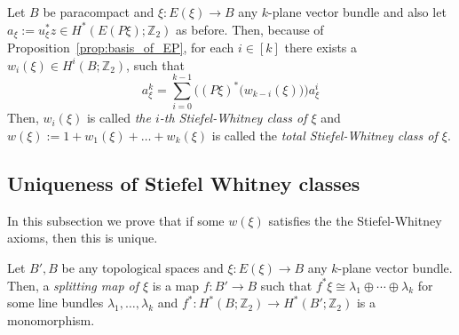 \begin{definition}\label{def:SW} Let $B$ be paracompact and $\xi:E(\xi)\to B$ any $k$-plane vector bundle and also let $a_{\xi}:=u_{\xi}^*z\in H^*(E(P\xi);\mathbb{Z}_2)$ as before. Then, because of Proposition~\ref{prop:basis_of_EP}, for each $i\in[k]$ there exists a $w_i(\xi)\in H^i(B;\mathbb{Z}_2)$, such that
\[a_{\xi}^k=\sum_{i=0}^{k-1}\Big((P\xi)^*\big(w_{k-i}(\xi)\big)\Big)a_{\xi}^i\]
Then, $w_i(\xi)$ is called \emph{the $i$-th Stiefel-Whitney class of $\xi$} and $w(\xi):=1+w_1(\xi)+\ldots+w_k(\xi)$ is called the \emph{total Stiefel-Whitney class of $\xi$}.
\end{definition}

\subsection{Uniqueness of Stiefel Whitney classes}
In this subsection we prove that if some $w(\xi)$ satisfies the the Stiefel-Whitney axioms, then this is unique.

\begin{definition} Let $B',B$ be any topological spaces and $\xi:E(\xi)\to B$ any $k$-plane vector bundle. Then, a \emph{splitting map of $\xi$} is a map $f:B'\to B$ such that $f^*\xi\cong\lambda_1\oplus\cdots\oplus\lambda_k$ for some line bundles $\lambda_1,\ldots,\lambda_k$ and $f^*:H^*(B;\mathbb{Z}_2)\to H^*(B';\mathbb{Z}_2)$ is a monomorphism.
\end{definition}

